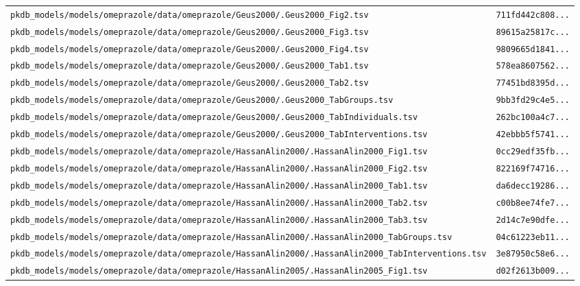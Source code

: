 \begin{longtable}{ll}
\texttt{pkdb\_models/models/omeprazole/data/omeprazole/Geus2000/.Geus2000\_Fig2.tsv} & \texttt{711fd442c808...} \\
\texttt{pkdb\_models/models/omeprazole/data/omeprazole/Geus2000/.Geus2000\_Fig3.tsv} & \texttt{89615a25817c...} \\
\texttt{pkdb\_models/models/omeprazole/data/omeprazole/Geus2000/.Geus2000\_Fig4.tsv} & \texttt{9809665d1841...} \\
\texttt{pkdb\_models/models/omeprazole/data/omeprazole/Geus2000/.Geus2000\_Tab1.tsv} & \texttt{578ea8607562...} \\
\texttt{pkdb\_models/models/omeprazole/data/omeprazole/Geus2000/.Geus2000\_Tab2.tsv} & \texttt{77451bd8395d...} \\
\texttt{pkdb\_models/models/omeprazole/data/omeprazole/Geus2000/.Geus2000\_TabGroups.tsv} & \texttt{9bb3fd29c4e5...} \\
\texttt{pkdb\_models/models/omeprazole/data/omeprazole/Geus2000/.Geus2000\_TabIndividuals.tsv} & \texttt{262bc100a4c7...} \\
\texttt{pkdb\_models/models/omeprazole/data/omeprazole/Geus2000/.Geus2000\_TabInterventions.tsv} & \texttt{42ebbb5f5741...} \\
\texttt{pkdb\_models/models/omeprazole/data/omeprazole/HassanAlin2000/.HassanAlin2000\_Fig1.tsv} & \texttt{0cc29edf35fb...} \\
\texttt{pkdb\_models/models/omeprazole/data/omeprazole/HassanAlin2000/.HassanAlin2000\_Fig2.tsv} & \texttt{822169f74716...} \\
\texttt{pkdb\_models/models/omeprazole/data/omeprazole/HassanAlin2000/.HassanAlin2000\_Tab1.tsv} & \texttt{da6decc19286...} \\
\texttt{pkdb\_models/models/omeprazole/data/omeprazole/HassanAlin2000/.HassanAlin2000\_Tab2.tsv} & \texttt{c00b8ee74fe7...} \\
\texttt{pkdb\_models/models/omeprazole/data/omeprazole/HassanAlin2000/.HassanAlin2000\_Tab3.tsv} & \texttt{2d14c7e90dfe...} \\
\texttt{pkdb\_models/models/omeprazole/data/omeprazole/HassanAlin2000/.HassanAlin2000\_TabGroups.tsv} & \texttt{04c61223eb11...} \\
\texttt{pkdb\_models/models/omeprazole/data/omeprazole/HassanAlin2000/.HassanAlin2000\_TabInterventions.tsv} & \texttt{3e87950c58e6...} \\
\texttt{pkdb\_models/models/omeprazole/data/omeprazole/HassanAlin2005/.HassanAlin2005\_Fig1.tsv} & \texttt{d02f2613b009...} \\

\end{longtable}
